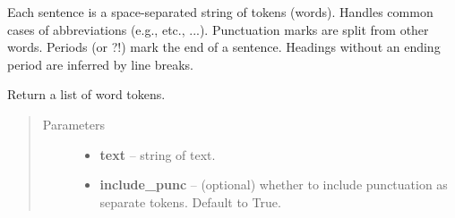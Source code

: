 \documentclass[letterpaper,10pt,english]{sphinxmanual}
\begin{document}
\begin{fulllineitems}
\begin{fulllineitems}
Each sentence is a space-separated string of tokens (words).
Handles common cases of abbreviations (e.g., etc., ...).
Punctuation marks are split from other words. Periods (or ?!) mark the end of a sentence.
Headings without an ending period are inferred by line breaks.

\end{fulllineitems}


\begin{fulllineitems}
\label{api_reference:textblob_de.tokenizers.PatternTokenizer.tokenize}
Return a list of word tokens.
\begin{quote}\begin{description}
\item[{Parameters}] \leavevmode\begin{itemize}
\item {} 
\textbf{text} -- string of text.

\item {} 
\textbf{include\_punc} -- (optional) whether to include punctuation as separate
tokens. Default to True.

\end{itemize}

\end{description}\end{quote}

\end{fulllineitems}


\end{fulllineitems}

\end{document}
